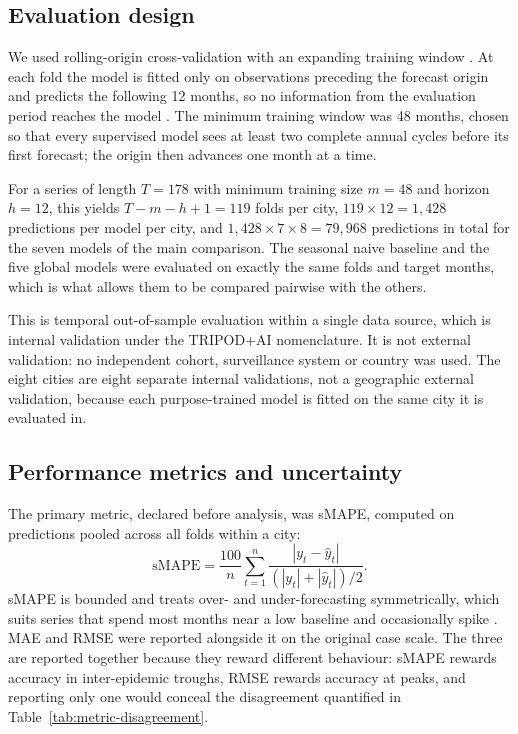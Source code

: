 \documentclass[11pt]{article}
\begin{document}
\subsection{Evaluation design}

We used rolling-origin cross-validation with an expanding training window
\citep{Tashman2000,Hewamalage2023}. At each fold the model is fitted only on observations
preceding the forecast origin and predicts the following 12 months, so no information
from the evaluation period reaches the model \citep{Kapoor2023}. The minimum training
window was 48 months, chosen so that every supervised model sees at least two complete
annual cycles before its first forecast; the origin then advances one month at a time.

For a series of length $T = 178$ with minimum training size $m = 48$ and horizon
$h = 12$, this yields $T - m - h + 1 = 119$ folds per city, $119 \times 12 = 1{,}428$
predictions per model per city, and $1{,}428 \times 7 \times 8 = 79{,}968$ predictions in
total for the seven models of the main comparison. The seasonal naive baseline and the
five global models were evaluated on exactly the same folds and target months, which is
what allows them to be compared pairwise with the others.

This is temporal out-of-sample evaluation within a single data source, which is internal
validation under the TRIPOD+AI nomenclature. It is not external validation: no
independent cohort, surveillance system or country was used. The eight cities are eight
separate internal validations, not a geographic external validation, because each
purpose-trained model is fitted on the same city it is evaluated in.

\subsection{Performance metrics and uncertainty}

The primary metric, declared before analysis, was sMAPE, computed on predictions pooled
across all folds within a city:
\[
\mathrm{sMAPE} = \frac{100}{n}\sum_{t=1}^{n}
\frac{|y_t - \hat{y}_t|}{(|y_t| + |\hat{y}_t|)/2}.
\]
sMAPE is bounded and treats over- and under-forecasting symmetrically, which suits series
that spend most months near a low baseline and occasionally spike
\citep{Hewamalage2023}. MAE and RMSE were reported alongside it on the original case
scale. The three are reported together because they reward different behaviour: sMAPE
rewards accuracy in inter-epidemic troughs, RMSE rewards accuracy at peaks, and reporting
only one would conceal the disagreement quantified in Table~\ref{tab:metric-disagreement}.
\end{document}

